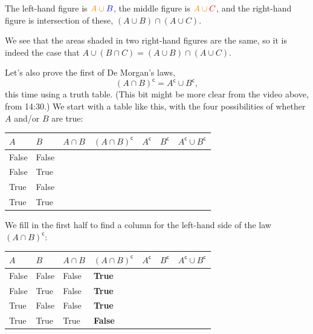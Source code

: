 \documentclass[
  a4paper,
]{book}
\theoremstyle{definition}
\theoremstyle{definition}
\theoremstyle{definition}
\theoremstyle{definition}
\theoremstyle{remark}
\begin{document}
The left-hand figure is \(\color{orange}{A} \cup \color{blue}{B}\), the middle figure is \(\color{orange}{A}\cup \color{red}{C}\), and the right-hand figure is intersection of these, \((A\cup B)\cap (A\cup C)\).

We see that the areas shaded in two right-hand figures are the same, so it is indeed the case that
\(A\cup (B\cap C) = (A\cup B)\cap (A\cup C)\).

Let's also prove the first of De Morgan's laws,
\[ (A \cap B)^\mathsf{c}= A^\mathsf{c}\cup B^\mathsf{c}, \]
this time using a truth table. (This bit might be more clear from the video above, from 14:30.) We start with a table like this, with the four possibilities of whether \(A\) and/or \(B\) are true:

\begin{longtable}[]{@{}
  >{\centering\arraybackslash}p{}
  >{\centering\arraybackslash}p{}
  >{\centering\arraybackslash}p{}
  >{\centering\arraybackslash}p{}
  >{\centering\arraybackslash}p{}
  >{\centering\arraybackslash}p{}
  >{\centering\arraybackslash}p{}@{}}
\toprule
\(A\) & \(B\) & \(A\cap B\) & \((A \cap B)^\mathsf{c}\) & \(A^\mathsf{c}\) & \(B^\mathsf{c}\) & \(A^\mathsf{c}\cup B^\mathsf{c}\) \\
\midrule
\endhead
False & False & & & & & \\
False & True & & & & & \\
True & False & & & & & \\
True & True & & & & & \\
\bottomrule
\end{longtable}

We fill in the first half to find a column for the left-hand side of the law \((A \cap B)^\mathsf{c}\):

\begin{longtable}[]{@{}
  >{\centering\arraybackslash}p{}
  >{\centering\arraybackslash}p{}
  >{\centering\arraybackslash}p{}
  >{\centering\arraybackslash}p{}
  >{\centering\arraybackslash}p{}
  >{\centering\arraybackslash}p{}
  >{\centering\arraybackslash}p{}@{}}
\toprule
\(A\) & \(B\) & \(A\cap B\) & \((A \cap B)^\mathsf{c}\) & \(A^\mathsf{c}\) & \(B^\mathsf{c}\) & \(A^\mathsf{c}\cup B^\mathsf{c}\) \\
\midrule
\endhead
False & False & False & \textbf{True} & & & \\
False & True & False & \textbf{True} & & & \\
True & False & False & \textbf{True} & & & \\
True & True & True & \textbf{False} & & & \\
\bottomrule
\end{longtable}
\end{document}
